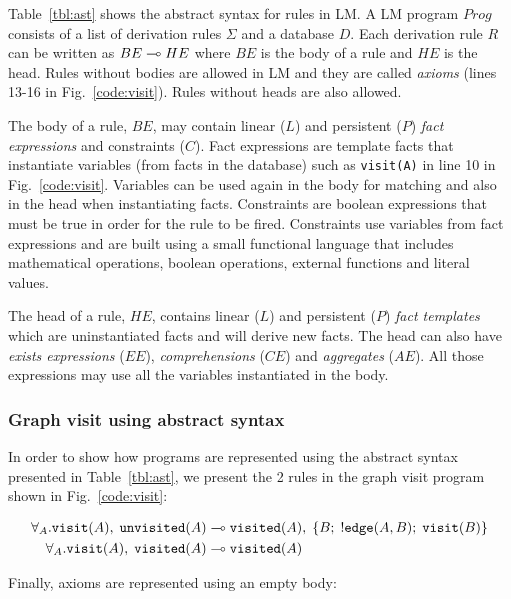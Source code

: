 Table~\ref{tbl:ast} shows the abstract syntax for rules in LM.  A LM program
$Prog$ consists of a list of derivation rules $\Sigma$ and a database $D$.  Each
derivation rule $R$ can be written as $BE \multimap HE$ where $BE$ is the body of a
rule and $HE$ is the head. Rules without bodies are allowed in LM and they are
called \textit{axioms} (lines 13-16 in Fig.~\ref{code:visit}). Rules without
heads are also allowed.

The body of a rule, $BE$, may contain linear ($L$) and persistent ($P$)
\emph{fact expressions} and constraints ($C$). Fact expressions are template
facts that instantiate variables (from facts in the database) such as
\texttt{visit(A)} in line 10 in Fig.~\ref{code:visit}. Variables can be used
again in the body for matching and also in the head when instantiating facts.
Constraints are boolean expressions that must be true in order for the rule
to be fired. Constraints use variables from fact expressions and are built
using a small functional language that includes mathematical operations,
boolean operations, external functions and literal values.

The head of a rule, $HE$, contains linear ($L$) and persistent ($P$) \emph{fact
templates} which are uninstantiated facts and will derive new facts. The head
can also have \emph{exists expressions} ($EE$), \emph{comprehensions} ($CE$)
and \emph{aggregates} ($AE$). All those expressions may use all the variables
instantiated in the body.

\subsubsection{Graph visit using abstract syntax}\label{visit:ast}

In order to show how programs are represented using the abstract syntax
presented in Table~\ref{tbl:ast}, we present the 2 rules in the graph visit
program shown in Fig.~\ref{code:visit}:

\nopagebreak

\begin{align}
\forall_A. \mathtt{visit}(A), \; \mathtt{unvisited}(A) \multimap & \;
\mathtt{visited}(A), \; \{ B; \; {!} \mathtt{edge}(A, B); \;
\mathtt{visit}(B)\}\\
\forall_A. \mathtt{visit}(A), \; \mathtt{visited}(A) \multimap & \;
\mathtt{visited}(A)
\end{align}

Finally, axioms are represented using an empty body:

